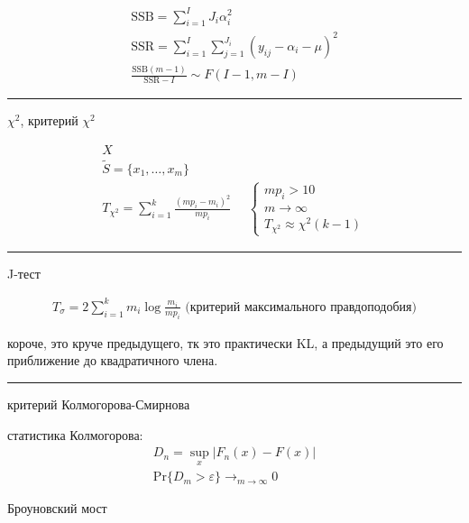 \documentclass{book}
\begin{document}
\begin{gather*}
  \mathrm{SSB}=\sum_{i=1}^{I} {J_i\alpha_i^2}\\
  \mathrm{SSR}=\sum_{i=1}^{I} \sum_{j=1}^{J_i} {(y_{ij}-\alpha_i-\mu)^2}\\
  \frac{\mathrm{SSB}(m-1)}{\mathrm{SSR}- I} \sim F(I-1, m-I)
\end{gather*}


\hrule

$\chi^2$, критерий $\chi^2$

\begin{gather*}
  X\\
  \tilde{S}=\{x_1, \dots, x_m\}\\
  T_{\chi^2}=\sum_{i=1}^{k} {\frac{(mp_i-m_i)^2}{mp_i}}
  ~~~~~~
  \begin{cases}
      mp_i > 10\\
      m\rightarrow\infty\\
      T_{\chi^2} \approx \chi^2(k-1)
  \end{cases}
\end{gather*}

\hrule

J-тест

\begin{gather*}
  T_{\sigma}=2 \sum_{i=1}^{k} {m_i\log \frac{m_i}{mp_i}}\textrm{ (критерий максимального правдоподобия)}
\end{gather*}

короче, это круче предыдущего, тк это практически KL, а предыдущий это его приближение до квадратичного члена.

\hrule

критерий Колмогорова-Смирнова

статистика Колмогорова:
\begin{gather*}
    D_n=\sup_x |F_n(x)-F(x)|\\
    \mathrm{Pr}\{D_m>\varepsilon\} \rightarrow_{m\rightarrow\infty} 0
\end{gather*}


Броуновский мост
\end{document}
